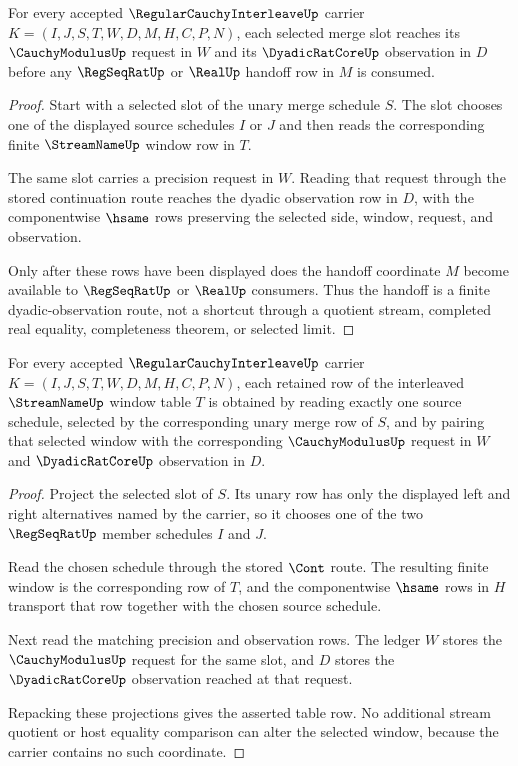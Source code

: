\begin{theorem}
\label{thm:regular-cauchy-interleave-dyadic-observation-handoff}
For every accepted $\RegularCauchyInterleaveUp$ carrier $K=(I,J,S,T,W,D,M,H,C,P,N)$, each selected merge slot reaches its $\CauchyModulusUp$ request in $W$ and its $\DyadicRatCoreUp$ observation in $D$ before any $\RegSeqRatUp$ or $\RealUp$ handoff row in $M$ is consumed.
\end{theorem}
\begin{proof}
Start with a selected slot of the unary merge schedule $S$. The slot chooses one of the displayed source schedules $I$ or $J$ and then reads the corresponding finite $\StreamNameUp$ window row in $T$.

The same slot carries a precision request in $W$. Reading that request through the stored continuation route reaches the dyadic observation row in $D$, with the componentwise $\hsame$ rows preserving the selected side, window, request, and observation.

Only after these rows have been displayed does the handoff coordinate $M$ become available to $\RegSeqRatUp$ or $\RealUp$ consumers. Thus the handoff is a finite dyadic-observation route, not a shortcut through a quotient stream, completed real equality, completeness theorem, or selected limit.
\end{proof}

\begin{theorem}
\label{thm:regular-cauchy-interleave-window-merge-exactness}
For every accepted $\RegularCauchyInterleaveUp$ carrier $K=(I,J,S,T,W,D,M,H,C,P,N)$, each retained row of the interleaved $\StreamNameUp$ window table $T$ is obtained by reading exactly one source schedule, selected by the corresponding unary merge row of $S$, and by pairing that selected window with the corresponding $\CauchyModulusUp$ request in $W$ and $\DyadicRatCoreUp$ observation in $D$.
\end{theorem}
\begin{proof}
Project the selected slot of $S$. Its unary row has only the displayed left and right alternatives named by the carrier, so it chooses one of the two $\RegSeqRatUp$ member schedules $I$ and $J$.

Read the chosen schedule through the stored $\Cont$ route. The resulting finite window is the corresponding row of $T$, and the componentwise $\hsame$ rows in $H$ transport that row together with the chosen source schedule.

Next read the matching precision and observation rows. The ledger $W$ stores the $\CauchyModulusUp$ request for the same slot, and $D$ stores the $\DyadicRatCoreUp$ observation reached at that request.

Repacking these projections gives the asserted table row. No additional stream quotient or host equality comparison can alter the selected window, because the carrier contains no such coordinate.
\end{proof}

